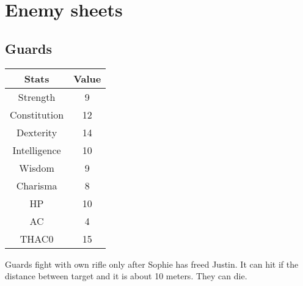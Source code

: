 \section{Enemy sheets}
\subsection{Guards}
\begin{table}[H]
\begin{tabular}{|c|c|}
\hline
\rowcolor[HTML]{C0C0C0} 
\textbf{Stats} & \textbf{Value} \\ \hline
Strength & 9 \\ \hline
Constitution & 12 \\ \hline
Dexterity & 14 \\ \hline
Intelligence & 10 \\ \hline
Wisdom & 9 \\ \hline
Charisma & 8 \\ \hline
HP & 10 \\ \hline
AC & 4 \\ \hline
THAC0 & 15 \\ \hline
\end{tabular}
\end{table}
Guards fight with own rifle only after Sophie has freed Justin. It can hit if the distance between target and it is about 10 meters. They can die. 
